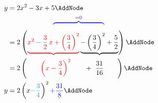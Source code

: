 \documentclass[a4paper,11pt]{article}
\begin{document}
\begin{preview}
\begin{NodesList}[margin=1cm]
  \begin{displaymath}\displaywidth=.2\linewidth
    \begin{aligned}
    y &= 2x^2 -3x +5                          \AddNode\\
  & \hphantom{= \ 2\left(x^2-\frac{3}{2}\,x\right. }%
      \textcolor{blue}{%
        \overbrace{\hphantom{+\left(\frac{3}{4}\right)^2- %
          \left(\frac{3}{4}\right)^2}}^{=0}}   \\
  &= 2\left(\textcolor{red}{%
       \underbrace{%
           x^2-\frac{3}{2}\,x + \left(\frac{3}{4}\right)^2}%
   }%
   \underbrace{%
        - \left(\frac{3}{4}\right)^2 + \frac{5}{2}}%
   \right)                                      \AddNode\\
   &= 2\left(\qquad\textcolor{red}{\left(x-\frac{3}{4}\right)^2}
   \qquad + \ \frac{31}{16}\qquad\right)  \AddNode\\
y
   &= 2\left(x\textcolor{cyan}{-\frac{3}{4}}\right)^2\textcolor{blue}{+\frac{31}{8}}\AddNode
\end{aligned}
         \end{displaymath}
{%
}
\end{NodesList}
\end{preview}
\end{document}
